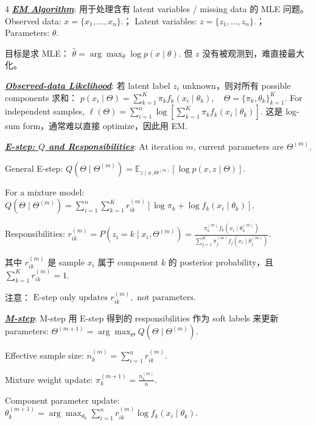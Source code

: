 \documentclass[12pt]{article}
\newcommand{\bulletPoint}[1]{\underline{\textit{\textbf{#1}}}}
\begin{document}
\begin{multicols*}{4}
\bulletPoint{EM Algorithm}:
用于处理含有 latent variables / missing data 的 MLE 问题。
Observed data:
$
x=\{x_1,\dots,x_n\}.
$；
Latent variables:
$
z=\{z_1,\dots,z_n\}.
$；
Parameters:
$
\theta.
$

目标是求 MLE：
$
\hat\theta
=
\arg\max_\theta \log p(x\mid \theta).
$
但 $z$ 没有被观测到，难直接最大化。

\bulletPoint{Observed-data Likelihood}:
若 latent label $z_i$ unknown，则对所有 possible components 求和：
$
p(x_i\mid \Theta)
=
\sum_{k=1}^K
\pi_k f_k(x_i\mid \theta_k),
\quad
\Theta=\{\pi_k,\theta_k\}_{k=1}^K.
$
For independent samples,
$
\ell(\Theta)
=
\sum_{i=1}^n
\log
\left[
\sum_{k=1}^K
\pi_k f_k(x_i\mid \theta_k)
\right].
$
这是 log-sum form，通常难以直接 optimize，因此用 EM.


\bulletPoint{E-step: $Q$ and Responsibilities}:
At iteration $m$, current parameters are $\Theta^{(m)}$.

General E-step:
$
Q(\Theta\mid\Theta^{(m)})
=
\mathbb E_{z\mid x,\Theta^{(m)}}
[
\log p(x,z\mid\Theta)
].
$

For a mixture model:
$
Q(\Theta\mid\Theta^{(m)})
=
\sum_{i=1}^n\sum_{k=1}^K
r_{ik}^{(m)}
\left[
\log \pi_k+\log f_k(x_i\mid\theta_k)
\right].
$

Responsibilities:
$
r_{ik}^{(m)}
=
P(z_i=k\mid x_i,\Theta^{(m)})
=
\frac{
\pi_k^{(m)} f_k(x_i\mid \theta_k^{(m)})
}{
\sum_{j=1}^K
\pi_j^{(m)} f_j(x_i\mid \theta_j^{(m)})
}.
$

其中 $r_{ik}^{(m)}$ 是 sample $x_i$ 属于 component $k$ 的 posterior probability，且
$
\sum_{k=1}^K r_{ik}^{(m)}=1.
$

注意：
$
\text{E-step only updates } r_{ik}^{(m)}, \text{ not parameters.}
$


\bulletPoint{M-step}:
M-step 用 E-step 得到的 responsibilities 作为 soft labels 来更新 parameters:
$
\Theta^{(m+1)}
=
\arg\max_{\Theta}
Q(\Theta\mid\Theta^{(m)}).
$

Effective sample size:
$
n_k^{(m)}
=
\sum_{i=1}^n r_{ik}^{(m)}.
$

Mixture weight update:
$
\pi_k^{(m+1)}
=
\frac{n_k^{(m)}}{n}.
$

Component parameter update:
$
\theta_k^{(m+1)}
=
\arg\max_{\theta_k}
\sum_{i=1}^n
r_{ik}^{(m)}
\log f_k(x_i\mid \theta_k).
$


\end{multicols*}
\end{document}
